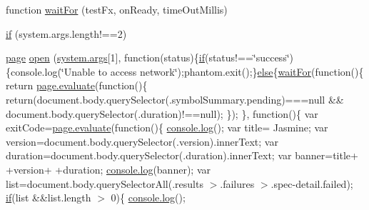 \begin{DoxyCompactItemize}
\item 
function \hyperlink{run-jasmine2_8js_a92050644a3b06d4b107af3a767f370b1}{wait\+For} (test\+Fx, on\+Ready, time\+Out\+Millis)
\item 
\hyperlink{run-jasmine2_8js_a257c1144ed4804cfc7074491c5f634f2}{if} (system.\+args.\+length!==2)
\item 
\hyperlink{waitfor_8js_a85d8b1b97106b359e1c9ee119ebe5832}{page} \hyperlink{run-jasmine2_8js_aef89592fec9d42900e1f7f2023f61286}{open} (\hyperlink{responsive-screenshot_8js_a64e5c861448a80a00f5c93e96de17d7a}{system.\+args}\mbox{[}1\mbox{]}, function(status)\{\hyperlink{sleepsort_8js_a41bc2f4fa2f08e1e174987b1c09445c1}{if}(status!==\char`\"{}success\char`\"{})\{console.\+log(\char`\"{}Unable to access network\char`\"{});phantom.\+exit();\}\hyperlink{sleepsort_8js_a0544c3fe466e421738dae463968b70ba}{else}\{\hyperlink{waitfor_8js_a92050644a3b06d4b107af3a767f370b1}{wait\+For}(function()\{                                       return \hyperlink{pagecallback_8js_a63376e151867d7c68f635e19817b9302}{page.\+evaluate}(function()\{                                                       return(document.\+body.\+query\+Selector(\textquotesingle{}.symbol\+Summary.\+pending\textquotesingle{})===null \&\&                                                                                       document.\+body.\+query\+Selector(\textquotesingle{}.duration\textquotesingle{})!==null);                                       \});                       \}, function()\{                                       var exit\+Code=\hyperlink{pagecallback_8js_a63376e151867d7c68f635e19817b9302}{page.\+evaluate}(function()\{                                                       \hyperlink{version_8js_a8805635a2f9bf454129d95456a5d317a}{console.\+log}(\textquotesingle{}\textquotesingle{});                                                       var title= \textquotesingle{}Jasmine\textquotesingle{};                                                       var version=document.\+body.\+query\+Selector(\textquotesingle{}.version\textquotesingle{}).inner\+Text;                                                       var duration=document.\+body.\+query\+Selector(\textquotesingle{}.duration\textquotesingle{}).inner\+Text;                                                       var banner=title+ \textquotesingle{} \textquotesingle{}+version+ \textquotesingle{} \textquotesingle{}+duration;                                                       \hyperlink{version_8js_a8805635a2f9bf454129d95456a5d317a}{console.\+log}(banner);                                                       var list=document.\+body.\+query\+Selector\+All(\textquotesingle{}.results $>$.failures $>$.spec-\/detail.\+failed\textquotesingle{});                                                       \hyperlink{sleepsort_8js_a41bc2f4fa2f08e1e174987b1c09445c1}{if}(list \&\&list.\+length $>$ 0)\{                                                               \hyperlink{version_8js_a8805635a2f9bf454129d95456a5d317a}{console.\+log}(\textquotesingle{}\textquotesingle{});                                                               
\end{DoxyCompactItemize}
